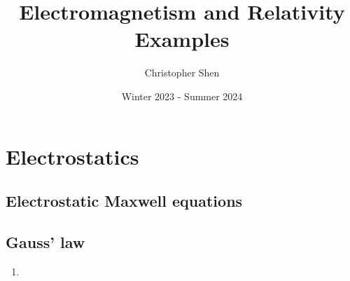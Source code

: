 \documentclass{article}
\title{Electromagnetism and Relativity Examples}
\author{Christopher Shen}
\date{Winter 2023 - Summer 2024}
\begin{document}
\maketitle
\newpage

\tableofcontents
\newpage

\pagestyle{fancy}
\fancyhead{}

\section{Electrostatics}

\subsection{Electrostatic Maxwell equations}

\subsection{Gauss' law}
\begin{enumerate}
    \item 
\end{enumerate}
\end{document}
